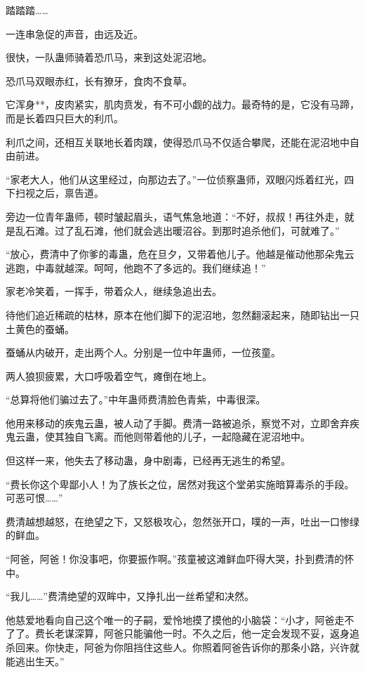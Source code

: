
\begin{this_body}

踏踏踏……

一连串急促的声音，由远及近。

很快，一队蛊师骑着恐爪马，来到这处泥沼地。

恐爪马双眼赤红，长有獠牙，食肉不食草。

它浑身**，皮肉紧实，肌肉贲发，有不可小觑的战力。最奇特的是，它没有马蹄，而是长着四只巨大的利爪。

利爪之间，还相互关联地长着肉蹼，使得恐爪马不仅适合攀爬，还能在泥沼地中自由前进。

“家老大人，他们从这里经过，向那边去了。”一位侦察蛊师，双眼闪烁着红光，四下扫视之后，禀告道。

旁边一位青年蛊师，顿时皱起眉头，语气焦急地道：“不好，叔叔！再往外走，就是乱石滩。过了乱石滩，他们就会逃出暖沼谷。到那时追杀他们，可就难了。”

“放心，费清中了你爹的毒蛊，危在旦夕，又带着他儿子。他越是催动他那朵鬼云逃跑，中毒就越深。呵呵，他跑不了多远的。我们继续追！”

家老冷笑着，一挥手，带着众人，继续急追出去。

待他们追近稀疏的枯林，原本在他们脚下的泥沼地，忽然翻滚起来，随即钻出一只土黄色的蚕蛹。

蚕蛹从内破开，走出两个人。分别是一位中年蛊师，一位孩童。

两人狼狈疲累，大口呼吸着空气，瘫倒在地上。

“总算将他们骗过去了。”中年蛊师费清脸色青紫，中毒很深。

他用来移动的疾鬼云蛊，被人动了手脚。费清一路被追杀，察觉不对，立即舍弃疾鬼云蛊，使其独自飞离。而他则带着他的儿子，一起隐藏在泥沼地中。

但这样一来，他失去了移动蛊，身中剧毒，已经再无逃生的希望。

“费长你这个卑鄙小人！为了族长之位，居然对我这个堂弟实施暗算毒杀的手段。可恶可恨……”

费清越想越怒，在绝望之下，又怒极攻心，忽然张开口，噗的一声，吐出一口惨绿的鲜血。

“阿爸，阿爸！你没事吧，你要振作啊。”孩童被这滩鲜血吓得大哭，扑到费清的怀中。

“我儿……”费清绝望的双眸中，又挣扎出一丝希望和决然。

他慈爱地看向自己这个唯一的子嗣，爱怜地摸了摸他的小脑袋：“小才，阿爸走不了了。费长老谋深算，阿爸只能骗他一时。不久之后，他一定会发现不妥，返身追杀回来。你快走，阿爸为你阻挡住这些人。你照着阿爸告诉你的那条小路，兴许就能逃出生天。”


\end{this_body}
